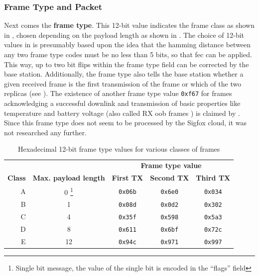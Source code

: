 \subsubsection{Frame Type and Packet}
Next comes the \textbf{frame type}.
This 12-bit value indicates the frame class as shown in , chosen depending on the payload length as shown in .
The choice of 12-bit values in  is presumably based upon the idea that the hamming distance between any two frame type codes must be no less than 5 bits, so that \gls{fec} can be applied.
This way, up to two bit flips within the frame type field can be corrected by the base station.
Additionally, the frame type also tells the base station whether a given received frame is the first transmission of the frame or which of the two replicas (see ).
The existence of another frame type value \texttt{0xf67} for frames acknowledging a successful downlink and transmission of basic properties like temperature and battery voltage (also called RX \gls{oob} frames \cite[page 11]{onsemi_datasheet}) is claimed by \cite{disk91radioprotocol}.
Since this frame type does not seem to be processed by the Sigfox cloud, it was not researched any further.

\begin{table}
	\centering
	\begin{minipage}{0.8\textwidth}
		\renewcommand{\thempfootnote}{\fnsymbol{mpfootnote}}
		\centering
		\begin{tabular}{r | c | c c c}
			& & \multicolumn{3}{c}{\textbf{Frame type value}} \\
			\textbf{Class} & \textbf{Max. payload length} & \textbf{First TX} & \textbf{Second TX} & \textbf{Third TX} \\ \hline
			A & 0 \footnote{Single bit message, the value of the single bit is encoded in the ``flags'' field} & \texttt{0x06b} & \texttt{0x6e0} & \texttt{0x034} \\
			B & 1 & \texttt{0x08d} & \texttt{0x0d2} & \texttt{0x302} \\
			C & 4 & \texttt{0x35f} & \texttt{0x598} & \texttt{0x5a3} \\
			D & 8 & \texttt{0x611} & \texttt{0x6bf} & \texttt{0x72c} \\
			E & 12 & \texttt{0x94c} & \texttt{0x971} & \texttt{0x997} \\
		\end{tabular}
	\end{minipage}
	\caption{Hexadecimal 12-bit frame type values for various classes of frames}
	\label{tab:frametype}
\end{table}

